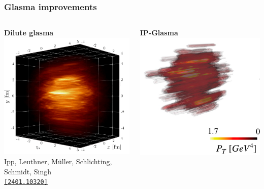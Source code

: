 \documentclass[aspectratio=169,11pt,usenames,dvipsnames]{beamer}
\begin{document}
\begin{frame}
    \frametitle{Glasma improvements}
    \vspace{-15pt}
        \begin{columns}[onlytextwidth,c]
                \begin{center}
                    {\scriptsize\bfseries Dilute glasma}
                    \\[1pt]
                    \includegraphics[width=0.6\columnwidth]{images/glasma_tau_0.4_paper.png}
                    \\[-4pt]
                    {\tiny Ipp, Leuthner, Müller, Schlichting, Schmidt, Singh} \\ \tiny \href{https://arxiv.org/abs/2401.10320}{\color{jyured}\texttt{[2401.10320]}\scalebox{.6}{$^\text{\tiny\faExternalLink}$}}
                \end{center}
                \begin{center}
                    {\scriptsize\bfseries IP-Glasma}
                    \\[1pt]
                    \includegraphics[width=0.6\columnwidth]{images/evolution.png}

\end{center}
\end{columns}
\end{frame}
\end{document}

